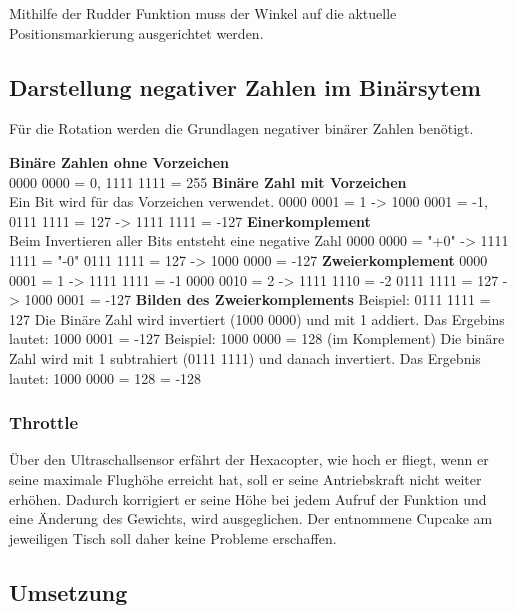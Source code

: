     Mithilfe der Rudder Funktion muss der Winkel auf die aktuelle Positionsmarkierung ausgerichtet werden.

    \subsection*{Darstellung negativer Zahlen im Binärsytem}

    Für die Rotation werden die Grundlagen negativer binärer Zahlen benötigt.

    \textbf{Binäre Zahlen ohne Vorzeichen}\\
    0000 0000 = 0, 1111 1111 = 255
    \textbf{Binäre Zahl mit Vorzeichen}\\
    Ein Bit wird für das Vorzeichen verwendet.
    0000 0001 = 1 -> 1000 0001 = -1,
    0111 1111 = 127 -> 1111 1111 = -127
    \textbf{Einerkomplement}\\
    Beim Invertieren aller Bits entsteht eine negative Zahl
    0000 0000 = "+0" -> 1111 1111 = "-0"
    0111 1111 = 127 -> 1000 0000 = -127
    \textbf{Zweierkomplement}
    0000 0001 = 1 -> 1111 1111 = -1
    0000 0010 = 2 -> 1111 1110 = -2
    0111 1111 = 127 -> 1000 0001 = -127
    \textbf{Bilden des Zweierkomplements}
    Beispiel: 0111 1111 = 127
    Die Binäre Zahl wird invertiert (1000 0000) und mit 1 addiert.
    Das Ergebins lautet: 1000 0001 = -127
    Beispiel: 1000 0000 = 128 (im Komplement)
    Die binäre Zahl wird mit 1 subtrahiert (0111 1111) und danach invertiert.
    Das Ergebnis lautet: 1000 0000 = 128 = -128


    \subsubsection{Throttle}
    Über den Ultraschallsensor erfährt der Hexacopter, wie hoch er fliegt, wenn er seine maximale Flughöhe erreicht hat, soll er seine Antriebskraft nicht weiter erhöhen. Dadurch korrigiert er seine Höhe bei jedem Aufruf der Funktion und eine Änderung des Gewichts, wird ausgeglichen. Der entnommene Cupcake am jeweiligen Tisch soll daher keine Probleme erschaffen.

  \subsection{Umsetzung}

